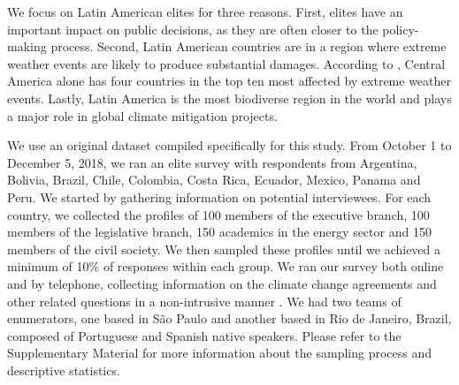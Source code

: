 \documentclass[a4paper,12pt]{article}
\begin{document}
We focus on Latin American elites for three reasons. First, elites have an important impact on public decisions, as they are often closer to the policy-making process. Second, Latin American countries are in a region where extreme weather events are likely to produce substantial damages. According to \citet{eckstein2017global}, Central America alone has four countries in the top ten most affected by extreme weather events. Lastly, Latin America is the most biodiverse region in the world and plays a major role in global climate mitigation projects. 

We use an original dataset compiled specifically for this study. From October 1 to December 5, 2018, we ran an elite survey with respondents from Argentina, Bolivia, Brazil, Chile, Colombia, Costa Rica, Ecuador, Mexico, Panama and Peru. We started by gathering information on potential interviewees. For each country, we collected the profiles of 100 members of the executive branch, 100 members of the legislative branch, 150 academics in the energy sector and 150 members of the civil society. We then sampled these profiles until we achieved a minimum of 10\% of responses within each group. We ran our survey both online and by telephone, collecting information on the climate change agreements and other related questions in a non-intrusive manner \citep{loewen2010help}. We had two teams of enumerators, one based in S\~{a}o Paulo and another based in Rio de Janeiro, Brazil, composed of Portuguese and Spanish native speakers. Please refer to the Supplementary Material for more information about the sampling process and descriptive statistics. \\
\end{document}
